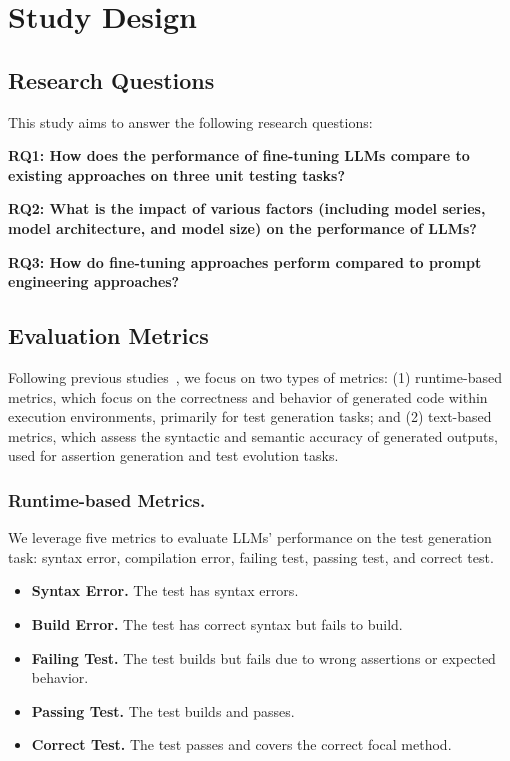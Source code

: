 \sloppy
\section{Study Design}
\label{sec:study_design} 

\subsection{Research Questions}

This study aims to answer the following research questions:

\textbf{RQ1: How does the performance of fine-tuning LLMs compare to existing approaches on three unit testing tasks?} 

\textbf{RQ2: What is the impact of various factors (including model series, model architecture, and model size) on the performance of LLMs?}

\textbf{RQ3: How do fine-tuning approaches perform compared to prompt engineering approaches?
}


\subsection{Evaluation Metrics}

Following previous studies~\cite{watson_learning_2020, yu_automated_2022, tufano_unit_2021, hu_identify_2023}, we focus on two types of metrics: (1) runtime-based metrics, which focus on the correctness and behavior of generated code within execution environments, primarily for test generation tasks; and (2) text-based metrics, which assess the syntactic and semantic accuracy of generated outputs, used for assertion generation and test evolution tasks.

\subsubsection{Runtime-based Metrics.}
We leverage five metrics to evaluate LLMs' performance on the test generation task: syntax error, compilation error, failing test, passing test, and correct test.


\begin{itemize}[leftmargin=1em]
    \item \textbf{Syntax Error.} The test has syntax errors.
    
    \item \textbf{Build Error.} The test has correct syntax but fails to build.
    
    \item \textbf{Failing Test.} The test builds but fails due to wrong assertions or expected behavior.
    
    \item \textbf{Passing Test.} The test builds and passes.
    
    \item \textbf{Correct Test.} The test passes and covers the correct focal method.
    
\end{itemize}


